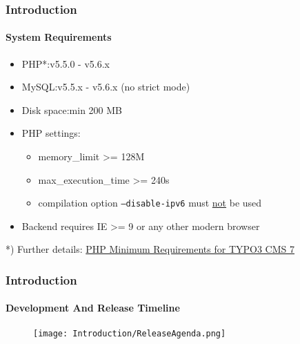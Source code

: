 \begin{frame}[fragile]
	\frametitle{Introduction}
	\framesubtitle{System Requirements}

	\begin{itemize}
		\item PHP*:\tabto{2.2cm}v5.5.0 - v5.6.x
		\item MySQL:\tabto{2.2cm}v5.5.x - v5.6.x (no strict mode)
		\item Disk space:\tabto{2.2cm}min 200 MB
		\item PHP settings:

			\begin{itemize}
				\item memory\_limit >= 128M
				\item max\_execution\_time >= 240s
				\item compilation option \texttt{--disable-ipv6} must \underline{not} be used
			\end{itemize}

		\item Backend requires IE >= 9 or any other modern browser

	\end{itemize}

	\vspace{1cm}
	*) Further details: \href{http://typo3.org/news/article/php-minimum-requirements-for-typo3-cms-7/}{PHP Minimum Requirements for TYPO3 CMS 7}

\end{frame}

\begin{frame}[fragile]
	\frametitle{Introduction}
	\framesubtitle{Development And Release Timeline}

	\begin{figure}
		\texttt{[image: Introduction/ReleaseAgenda.png]}
	\end{figure}

\end{frame}

